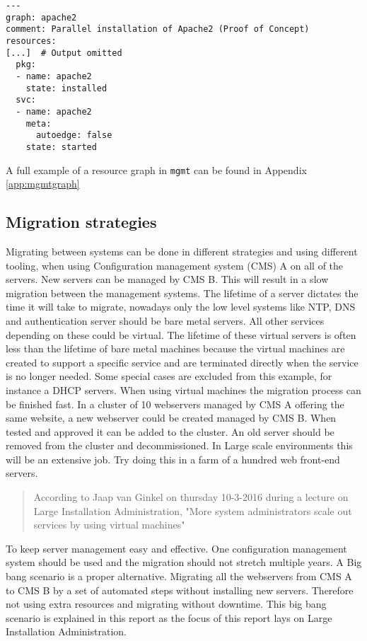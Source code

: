\begin{lstlisting}
---
graph: apache2
comment: Parallel installation of Apache2 (Proof of Concept)
resources:
[...]  # Output omitted
  pkg:
  - name: apache2
    state: installed
  svc:
  - name: apache2
    meta:
      autoedge: false
    state: started
\end{lstlisting}

A full example of a resource graph in \texttt{mgmt} can be found in Appendix \ref{app:mgmtgraph}

\subsection{Migration strategies}\label{subsec:migrationstrategies}
Migrating between systems can be done in different strategies and using different tooling, when using Configuration management system (CMS) A on all of the servers. New servers can be managed by CMS B. This will result in a slow migration between the management systems. The lifetime of a server dictates the time it will take to migrate, nowadays only the low level systems like NTP, DNS and authentication server should be bare metal servers. All other services depending on these could be virtual. The lifetime of these virtual servers is often less than the lifetime of bare metal machines because the virtual machines are created to support a specific service and are terminated directly when the service is no longer needed. Some special cases are excluded from this example, for instance a DHCP servers. When using virtual machines the migration process can be finished fast. In a cluster of 10 webservers managed by CMS A offering the same website, a new webserver could be created managed by CMS B. When tested and approved it can be added to the cluster. An old server should be removed from the cluster and decommissioned. In Large scale environments this will be an extensive job. Try doing this in a farm of a hundred web front-end servers.

\begin{quote}
According to Jaap van Ginkel on thursday 10-3-2016 during a lecture on Large Installation Administration, "More system administrators scale out services by using virtual machines"
\end{quote}

To keep server management easy and effective. One configuration management system should be used and the migration should not stretch multiple years. A Big bang scenario is a proper alternative. Migrating all the webservers from CMS A to CMS B by a set of automated steps without installing new servers. Therefore not using extra resources and migrating without downtime. This big bang scenario \cite{bigbang} is explained in this report as the focus of this report lays on Large Installation Administration.

